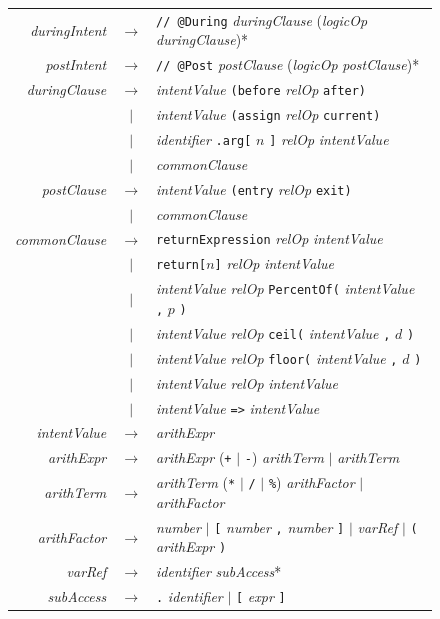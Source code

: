 \documentclass[pdflatex,sn-basic]{sn-jnl}%
\theoremstyle{thmstyleone}%
\theoremstyle{thmstyletwo}%
\theoremstyle{thmstylethree}%
\begin{document}
\begin{figure}[t]
\centering
\small
\begin{tabular}{@{}r@{\quad}c@{\quad}l@{}}
\textit{duringIntent} & $\rightarrow$ & \texttt{// @During} \textit{duringClause} (\textit{logicOp} \textit{duringClause})* \\[2pt]
\textit{postIntent} & $\rightarrow$ & \texttt{// @Post} \textit{postClause} (\textit{logicOp} \textit{postClause})* \\[6pt]

\textit{duringClause} & $\rightarrow$ & \textit{intentValue} \texttt{(before} \textit{relOp} \texttt{after)} \\
& $|$ & \textit{intentValue} \texttt{(assign} \textit{relOp} \texttt{current)} \\
& $|$ & \textit{identifier} \texttt{.arg[} $n$ \texttt{]} \textit{relOp} \textit{intentValue} \\
& $|$ & \textit{commonClause} \\[6pt]

\textit{postClause} & $\rightarrow$ & \textit{intentValue} \texttt{(entry} \textit{relOp} \texttt{exit)} \\
& $|$ & \textit{commonClause} \\[6pt]

\textit{commonClause} & $\rightarrow$ & \texttt{returnExpression} \textit{relOp} \textit{intentValue} \\
& $|$ & \texttt{return[}$n$\texttt{]} \textit{relOp} \textit{intentValue} \\
& $|$ & \textit{intentValue} \textit{relOp} \texttt{PercentOf(} \textit{intentValue} \texttt{,} $p$ \texttt{)} \\
& $|$ & \textit{intentValue} \textit{relOp} \texttt{ceil(} \textit{intentValue} \texttt{,} $d$ \texttt{)} \\
& $|$ & \textit{intentValue} \textit{relOp} \texttt{floor(} \textit{intentValue} \texttt{,} $d$ \texttt{)} \\
& $|$ & \textit{intentValue} \textit{relOp} \textit{intentValue} \\
& $|$ & \textit{intentValue} \texttt{=>} \textit{intentValue} \\[6pt]

\textit{intentValue} & $\rightarrow$ & \textit{arithExpr} \\[2pt]
\textit{arithExpr} & $\rightarrow$ & \textit{arithExpr} (\texttt{+} $|$ \texttt{-}) \textit{arithTerm} $|$ \textit{arithTerm} \\
\textit{arithTerm} & $\rightarrow$ & \textit{arithTerm} (\texttt{*} $|$ \texttt{/} $|$ \texttt{\%}) \textit{arithFactor} $|$ \textit{arithFactor} \\
\textit{arithFactor} & $\rightarrow$ & \textit{number} $|$ \texttt{[} \textit{number} \texttt{,} \textit{number} \texttt{]} $|$ \textit{varRef} $|$ \texttt{(} \textit{arithExpr} \texttt{)} \\[2pt]
\textit{varRef} & $\rightarrow$ & \textit{identifier} \textit{subAccess}* \\
\textit{subAccess} & $\rightarrow$ & \texttt{.} \textit{identifier} $|$ \texttt{[} \textit{expr} \texttt{]} \\[6pt]


\end{tabular}
\end{figure}
\end{document}
